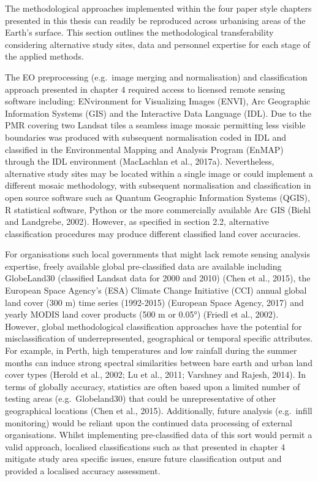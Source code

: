 \documentclass[]{book}
\begin{document}
The methodological approaches implemented within the four paper style
chapters presented in this thesis can readily be reproduced across
urbanising areas of the Earth's surface. This section outlines the
methodological transferability considering alternative study sites, data
and personnel expertise for each stage of the applied methods.

The EO preprocessing (e.g.~image merging and normalisation) and
classification approach presented in chapter 4 required access to
licensed remote sensing software including: ENvironment for Visualizing
Images (ENVI), Arc Geographic Information Systems (GIS) and the
Interactive Data Language (IDL). Due to the PMR covering two Landsat
tiles a seamless image mosaic permitting less visible boundaries was
produced with subsequent normalisation coded in IDL and classified in
the Environmental Mapping and Analysis Program (EnMAP) through the IDL
environment (MacLachlan et al., 2017a). Nevertheless, alternative study
sites may be located within a single image or could implement a
different mosaic methodology, with subsequent normalisation and
classification in open source software such as Quantum Geographic
Information Systems (QGIS), R statistical software, Python or the more
commercially available Arc GIS (Biehl and Landgrebe, 2002). However, as
specified in section 2.2, alternative classification procedures may
produce different classified land cover accuracies.

For organisations such local governments that might lack remote sensing
analysis expertise, freely available global pre-classified data are
available including GlobeLand30 (classified Landsat data for 2000 and
2010) (Chen et al., 2015), the European Space Agency's (ESA) Climate
Change Initiative (CCI) annual global land cover (300 m) time series
(1992-2015) (European Space Agency, 2017) and yearly MODIS land cover
products (500 m or 0.05°) (Friedl et al., 2002). However, global
methodological classification approaches have the potential for
misclassification of underrepresented, geographical or temporal specific
attributes. For example, in Perth, high temperatures and low rainfall
during the summer months can induce strong spectral similarities between
bare earth and urban land cover types (Herold et al., 2002; Lu et al.,
2011; Varshney and Rajesh, 2014). In terms of globally accuracy,
statistics are often based upon a limited number of testing areas
(e.g.~Globeland30) that could be unrepresentative of other geographical
locations (Chen et al., 2015). Additionally, future analysis
(e.g.~infill monitoring) would be reliant upon the continued data
processing of external organisations. Whilst implementing pre-classified
data of this sort would permit a valid approach, localised
classifications such as that presented in chapter 4 mitigate study area
specific issues, ensure future classification output and provided a
localised accuracy assessment.
\end{document}
